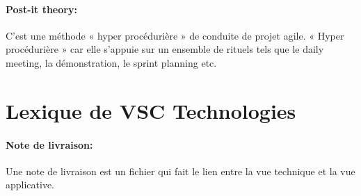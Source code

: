 \paragraph{Post-it theory: }
\label{lexi:post_it_theory}
C’est une méthode « hyper procédurière » de conduite de projet agile.
« Hyper procédurière » car elle s’appuie sur un ensemble de rituels tels que le daily meeting, la démonstration, le sprint planning etc.

\section{Lexique de VSC Technologies}

\paragraph{Note de livraison: }
\label{lexi:delivery_note}
Une note de livraison est un fichier qui fait le lien entre la vue technique et la vue applicative.
